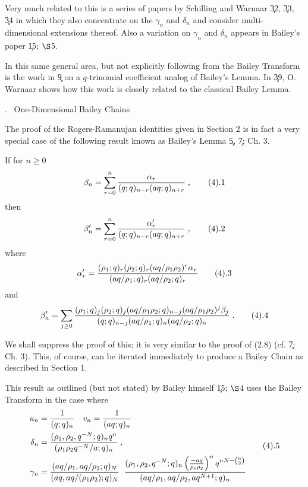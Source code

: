 Very much related to this is a series of papers by Schilling and
Warnaar \c{32}, \c{33}, \c{34} in which they also concentrate on the
$\gamma_n$ and $\delta_n$ and consider multi-dimensional extensions
thereof.  Also a variation on $\gamma_n$ and $\delta_n$ appears 
in Bailey's paper \c{15; $\S$5}.

In this same general area, but not explicitly following from the
Bailey Transform is the work in \c9 on a $q$-trinomial coefficient
analog of Bailey's Lemma.  In \c{39}, O. Warnaar shows how this work is
closely related to the classical Bailey Lemma.

. \ One-Dimensional Bailey Chains
\endsubhead

The proof of the Rogers-Ramanujan identities given in Section 2 is in
fact a very special case of the following result known as Bailey's
Lemma \c5, \c{7; Ch. 3}.

If for $n\geq 0$
$$
	\beta_n = \sum_{r=0}^n \fr{\alpha_r}{(q;q)_{n-r}(aq;q)_{n+r}}\;,
\tag4.1
$$
then
$$
	\beta_n' = \sum_{r=0}^n \fr{\alpha_r'}{(q;q)_{n-r}(aq;q)_{n+r}}\;,
\tag4.2
$$
where
$$
	\alpha_r' = \fr{(\rho_1;q)_r(\rho_2;q)_r(aq/\rho_1\rho_2)^r \alpha_r}
	{(aq/\rho_1;q)_r(aq/\rho_2;q)_r} 
\tag4.3
$$
and
$$
	\beta_n' = \sum_{j\geq 0} \fr{(\rho_1;q)_j(\rho_2;q)_j
		(aq/\rho_1\rho_2;q)_{n-j}(aq/\rho_1\rho_2)^j \beta_j}
		{(q;q)_{n-j}(aq/\rho_1;q)_n(aq/\rho_2;q)_n}\;.
\tag4.4
$$

We shall suppress the proof of this; it is very similar to the proof
of (2.8) (cf. \c{7; Ch. 3}).  This, of course, can be iterated
immediately to produce a Bailey Chain as described in Section 1.

This result as outlined (but not stated) by Bailey himself \c{15; $\S$4}
uses the Bailey Transform in the case where
$$
\aligned
 	u_n & = \fr1{(q;q)_n} \quad v_n = \fr1{(aq;q)_n}   \\
	\delta_n & = \fr{(\rho_1, \rho_2, q^{-N};q)_n q^n}{(\rho_1
	\rho_2 q^{-N}/a;q)_n}\;,  \\
	\gamma_n & = \fr{(aq/\rho_1,aq/\rho_2;q)_N}{(aq,aq/(\rho_1\rho_2);q)_N}
	\;\; \fr{(\rho_1,\rho_2, q^{-N};q)_n \left(\fr{-aq}{\rho_1\rho_2}
	\right)^n q^{nN-\binom{n}{2}}}{(aq/\rho_1, aq/\rho_2,aq^{N+1};q)_n}
\endaligned
\tag4.5
$$

